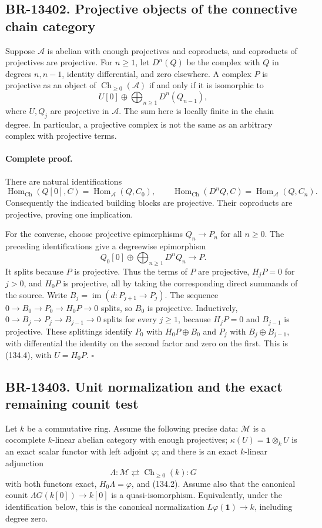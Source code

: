 \subsection{BR-13402. Projective objects of the connective chain category}
Suppose \(\mathcal A\) is abelian with enough projectives and
coproducts, and coproducts of projectives are projective.  For
\(n\geq1\), let \(D^n(Q)\) be the complex with \(Q\) in degrees
\(n,n-1\), identity differential, and zero elsewhere.  A complex
\(P\) is projective as an object of
\(\operatorname{Ch}_{\geq0}(\mathcal A)\) if and only if it is
isomorphic to
\[
 U[0]\oplus\bigoplus_{n\geq1}D^n(Q_{n-1}),
 \tag{134.4}
\]
where \(U,Q_j\) are projective in \(\mathcal A\).  The sum here is
locally finite in the chain degree.  In particular, a projective
complex is not the same as an arbitrary complex with projective terms.

\paragraph{Complete proof.}
There are natural identifications
\[
 \operatorname{Hom}_{\mathrm{Ch}}(Q[0],C)
   =\operatorname{Hom}_{\mathcal A}(Q,C_0),\qquad
 \operatorname{Hom}_{\mathrm{Ch}}(D^nQ,C)
   =\operatorname{Hom}_{\mathcal A}(Q,C_n).
\]
Consequently the indicated building blocks are projective.  Their
coproducts are projective, proving one implication.

For the converse, choose projective epimorphisms \(Q_n\to P_n\)
for all \(n\geq0\).  The preceding identifications give a degreewise
epimorphism
\[
 Q_0[0]\oplus\bigoplus_{n\geq1}D^nQ_n\longrightarrow P.
\]
It splits because \(P\) is projective.  Thus the terms of \(P\)
are projective, \(H_jP=0\) for \(j>0\), and \(H_0P\) is
projective, all by taking the corresponding direct summands of the
source.  Write \(B_j=\operatorname{im}(d:P_{j+1}\to P_j)\).
The sequence \(0\to B_0\to P_0\to H_0P\to0\) splits, so
\(B_0\) is projective.  Inductively,
\(0\to B_j\to P_j\to B_{j-1}\to0\) splits for every \(j\geq1\),
because \(H_jP=0\) and \(B_{j-1}\) is projective.  These splittings
identify \(P_0\) with \(H_0P\oplus B_0\) and \(P_j\) with
\(B_j\oplus B_{j-1}\), with differential the identity on the second
factor and zero on the first.  This is (134.4), with \(U=H_0P\).
\(\square\)

\subsection{BR-13403. Unit normalization and the exact remaining counit test}
Let \(k\) be a commutative ring.  Assume the following precise data:
\(\mathcal M\) is a cocomplete \(k\)-linear abelian category with
enough projectives; \(\kappa(U)=\mathbf1\otimes_k U\) is an exact
scalar functor with left adjoint \(\varphi\); and there is an exact
\(k\)-linear adjunction
\[
 \Lambda:\mathcal M\rightleftarrows
 \operatorname{Ch}_{\geq0}(k):G
 \tag{134.5}
\]
with both functors exact, \(H_0\Lambda=\varphi\), and (134.2).
Assume also that the canonical counit
\(\Lambda G(k[0])\to k[0]\) is a quasi-isomorphism.  Equivalently,
under the identification below, this is the canonical normalization
\(L\varphi(\mathbf1)\to k\), including degree zero.

